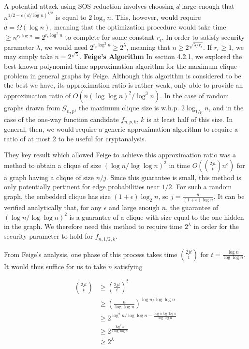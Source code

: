 \documentclass{article}
\theoremstyle{definition}
\begin{document}
A potential attack using SOS reduction involves choosing $d$ large enough 
that $n^{1/2-c(d/\log{n})^{1/2}}$ is equal to $2\log_2{n}$.  This, however, 
would require 
$d = \Omega(\log{n})$, meaning that the optimization procedure would 
take time $\geq n^{r_\epsilon\log{n}} = 2^{r_\epsilon\log^2{n}}$ to complete for some constant 
$r_\epsilon$.  In order to satisfy security parameter $\lambda$, we would need 
$2^{r_\epsilon\log^2{n}} \geq 2^\lambda$, meaning that $n \geq 2^{\sqrt{\lambda/r_\epsilon}}$.
If $r_\epsilon \geq 1$, we may simply take $n = 2^{\sqrt{\lambda}}$.
\newline\newline
\noindent \textbf{Feige's Algorithm } In section 4.2.1, we explored the 
best-known polynomial-time approximation algorithm for the maximum clique 
problem in general graphs by Feige.  Although this algorithm is considered 
to be the best we have, its approximation ratio is rather weak, only 
able to provide an approximation ratio of $O(n(\log{\log{n}})^2/\log^3{n})$.
In the case of random graphs drawn from $\mathcal{G}_{n,p}$, the maximum clique size
is w.h.p. $2\log_{1/p}{n}$, and in the case of the one-way function candidate 
$f_{n,p,k}$, $k$ is at least half of this size.  In general, then, we would 
require a generic approximation algorithm to require a ratio of at most 2 
to be useful for cryptanalysis.

They key result which allowed Feige to achieve this approximation ratio was a method to 
obtain a clique of size $(\log{n}/\log{\log{n}})^2$ in time 
$O(\binom{2jt}{t}n^c)$ for a graph having a clique of size $n/j$.  Since 
this guarantee is small, this method is only potentially pertinent for 
edge probabilities near $1/2$.  For such a random graph,
the embedded clique has size $(1+\epsilon)\log_2{n}$, so 
$j=\frac{n}{(1+\epsilon)\log{n}}$.  
It can be verified analytically that, for any $\epsilon$ and large enough $n$, the guarantee of  $(\log{n}/\log{\log{n}})^2$ is a guarantee of a clique with size equal to the one hidden 
in the graph.  We therefore need this method to require time $2^\lambda$ in order
for the security parameter to hold for $f_{n,1/2,k}$.

From Feige's analysis, one phase of this process takes time $\binom{2jt}{t}$ 
for $t = \frac{\log{n}}{\log\log{n}}$.  It would thus suffice for us to take
$n$ satisfying 

\begin{align*}
\binom{2jt}{t} &\geq (\frac{2jt}{t})^t \\
&\geq (\frac{n}{\log\log{n}})^{\log{n}/\log{\log{n}}} \\
&\geq 2^{\log^2{n}/\log{\log{n}} - \frac{\log{n}\log{\log{n}}}{\log{\log{n}}}} \\
&\geq 2^{\frac{\log^2{n}}{2\log{\log{n}}}} \\
&\geq 2^\lambda
\end{align*}
\end{document}
